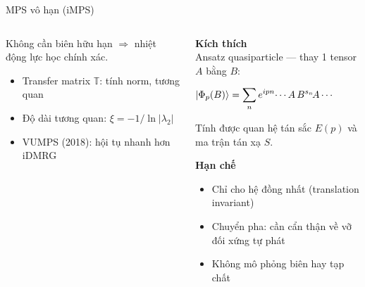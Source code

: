 \documentclass[aspectratio=169, 11pt]{beamer}
\newcommand{\eqn}[1]{\begin{center}\colorbox{eqbox}{\color{qcyan}$\displaystyle #1$}\end{center}}
\begin{document}
\begin{frame}[shrink=3]{MPS vô hạn (iMPS)}

\begin{columns}[T]
\begin{column}{0.48\textwidth}

\vspace{2pt}
\begin{center}
\end{center}

\vspace{6pt}
{\small Không cần biên hữu hạn $\Rightarrow$ nhiệt động lực học chính xác.}

\vspace{4pt}
{\small
\begin{itemize}
  \item Transfer matrix $\mathbb{T}$: tính norm, tương quan
  \item Độ dài tương quan: $\xi = -1/\ln|\lambda_2|$
  \item VUMPS (2018): hội tụ nhanh hơn iDMRG
\end{itemize}}

\end{column}
\begin{column}{0.48\textwidth}

\textcolor{qcyan}{\textbf{Kích thích}}\\[3pt]
{\small Ansatz quasiparticle — thay 1 tensor $A$ bằng $B$:}
\eqn{\ket{\Phi_p(B)} = \sum_n e^{ipn}\!\cdots A\,B^{s_n}\!A\cdots}
{\small Tính được quan hệ tán sắc $E(p)$ và ma trận tán xạ $S$.}

\vspace{6pt}
\textcolor{qpink}{\textbf{Hạn chế}}
{\small
\begin{itemize}
  \item Chỉ cho hệ đồng nhất (translation invariant)
  \item Chuyển pha: cần cẩn thận về vỡ đối xứng tự phát
  \item Không mô phỏng biên hay tạp chất
\end{itemize}}

\end{column}
\end{columns}

\end{frame}
\end{document}
